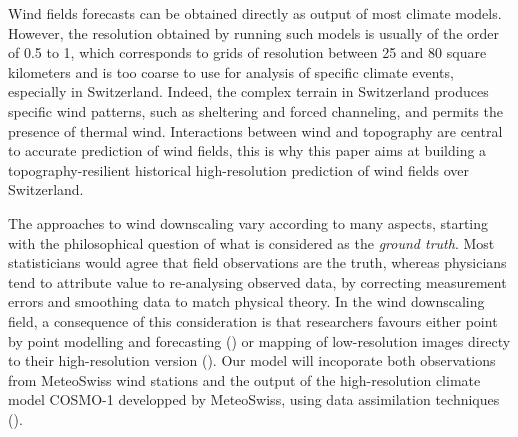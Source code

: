 \documentclass[11pt,a4paper]{amsart}
\theoremstyle{plain}
\theoremstyle{definition}
\theoremstyle{remark}
\theoremstyle{remark}
\theoremstyle{definition}
\newcommand{\1}{\mathbbm{1}}
\begin{document}
     Wind fields forecasts can be obtained directly as output of most climate models. However, the resolution obtained by running such models is usually of the order of 0.5 to 1\degree, which corresponds to grids of resolution between 25 and 80 square kilometers and is too coarse to use for analysis of specific climate events, especially in Switzerland. Indeed, the complex terrain in Switzerland produces specific wind patterns, such as sheltering and forced channeling, and permits the presence of thermal wind. Interactions between wind and topography are central to accurate prediction of wind fields, this is why this paper aims at building a topography-resilient historical high-resolution prediction of wind fields over Switzerland. 
     
     The approaches to wind downscaling vary according to many aspects, starting with the philosophical question of what is considered as the \textit{ground truth}. Most statisticians would agree that field observations are the truth, whereas physicians tend to attribute value to re-analysing observed data, by correcting measurement errors and smoothing data to match physical theory. In the wind downscaling field, a consequence of this consideration is that researchers favours either point by point modelling and forecasting (\cite{winstral2017statistical, nerini2020prob}) or mapping of low-resolution images directy to their high-resolution version (\cite{hohlein2020comparative, leinonen2020stochastic, ramon2021perfect}). Our model will incoporate both observations from MeteoSwiss wind stations and the output of the high-resolution climate model COSMO-1 developped by MeteoSwiss, using data assimilation techniques (\cite{gelfand2017handbook}).
     
\end{document}
